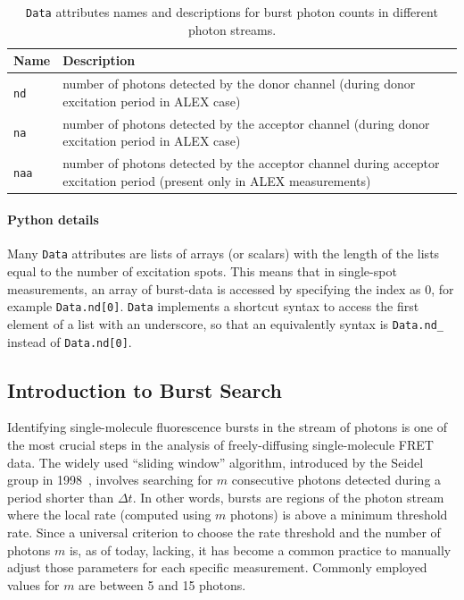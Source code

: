 \documentclass[10pt,letterpaper]{article}
\begin{document}
\begin{table}
\begin{tabular}{l p{}}
  Name  & Description \\
  \hline
  \verb|nd| & number of photons detected by the donor channel (during donor excitation period in ALEX case)\\
  \verb|na| & number of photons detected by the acceptor channel (during donor excitation period in ALEX case)\\
  \verb|naa| & number of photons detected by the acceptor channel during acceptor excitation period (present only in ALEX measurements)\\
\end{tabular}
\caption{\label{tab:data_n}\texttt{Data} attributes names and descriptions for burst photon counts in different photon streams.}
\end{table}


\paragraph*{Python details}
Many \verb|Data| attributes are lists of arrays (or scalars) with the length of the lists
equal to the number of excitation spots. This means that in
single-spot measurements, an array of burst-data
is accessed by specifying the index as 0, for example \verb|Data.nd[0]|.
\verb|Data| implements a shortcut syntax to access the first element of a list
with an underscore, so that an equivalently syntax is
\verb|Data.nd_| instead of \verb|Data.nd[0]|.

\subsection*{Introduction to Burst Search}
\label{sec:burstsearch_intro}

Identifying single-molecule fluorescence bursts in the stream of photons is
one of the most crucial steps in the analysis of freely-diffusing single-molecule FRET data.
The widely used ``sliding window'' algorithm, introduced by the Seidel group in
1998~\cite{Eggeling_1998,Fries_1998}, involves searching for
$m$ consecutive photons detected during a period shorter than
$\Delta t$. In other words, bursts are regions of the photon stream where the
local rate (computed using $m$ photons) is above a minimum threshold rate.
Since a universal criterion to choose the rate threshold and
the number of photons $m$ is, as of today, lacking, it has become a common
practice to manually adjust those parameters for each specific measurement.
Commonly employed values for $m$ are between 5 and 15 photons.
\end{document}

